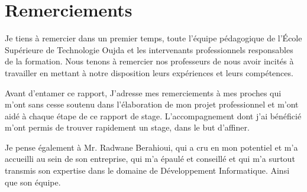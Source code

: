 \chapter*{Remerciements}


\hspace{12pt}Je tiens à remercier dans un premier temps, toute l’équipe pédagogique
de l’École Supérieure de Technologie Oujda et les intervenants professionnels
responsables de la formation. Nous tenons à remercier nos professeurs de nous
avoir incités à travailler en mettant à notre disposition leurs expériences et
leurs compétences.
\vspace{12pt}

\hspace{12pt}Avant d’entamer ce rapport, J’adresse mes remerciements à mes proches
qui m’ont sans cesse soutenu dans l’élaboration de mon projet professionnel
et m’ont aidé à chaque étape de ce rapport de stage. L’accompagnement
dont j’ai bénéficié m’ont permis de trouver rapidement un stage, dans le but
d’affiner.
\vspace{12pt}

\hspace{12pt}Je pense également à Mr. Radwane Berahioui, qui a cru en mon potentiel
et m’a accueilli au sein de son entreprise, qui m’a épaulé et conseillé et
qui m’a surtout transmis son expertise dans le domaine de Développement
Informatique. Ainsi que son équipe.
